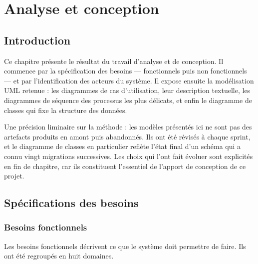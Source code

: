 \chapter{Analyse et conception}

\section*{Introduction}

Ce chapitre présente le résultat du travail d'analyse et de conception. Il
commence par la spécification des besoins --- fonctionnels puis non
fonctionnels --- et par l'identification des acteurs du système. Il expose
ensuite la modélisation UML retenue : les diagrammes de cas d'utilisation,
leur description textuelle, les diagrammes de séquence des processus les plus
délicats, et enfin le diagramme de classes qui fixe la structure des données.

Une précision liminaire sur la méthode : les modèles présentés ici ne sont pas
des artefacts produits en amont puis abandonnés. Ils ont été révisés à chaque
sprint, et le diagramme de classes en particulier reflète l'état final d'un
schéma qui a connu vingt migrations successives. Les choix qui l'ont fait
évoluer sont explicités en fin de chapitre, car ils constituent l'essentiel de
l'apport de conception de ce projet.

\section{Spécifications des besoins}

\subsection{Besoins fonctionnels}

Les besoins fonctionnels décrivent ce que le système doit permettre de faire.
Ils ont été regroupés en huit domaines.

